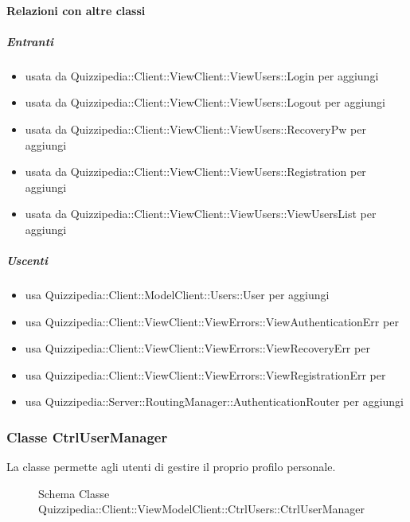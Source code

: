 \paragraph{Relazioni con altre classi}
\subparagraph{Entranti}
\begin{itemize}
\item usata da Quizzipedia::Client::ViewClient::ViewUsers::Login per aggiungi
\item usata da Quizzipedia::Client::ViewClient::ViewUsers::Logout per aggiungi
\item usata da Quizzipedia::Client::ViewClient::ViewUsers::RecoveryPw per aggiungi
\item usata da Quizzipedia::Client::ViewClient::ViewUsers::Registration per aggiungi
\item usata da Quizzipedia::Client::ViewClient::ViewUsers::ViewUsersList per aggiungi
\end{itemize}
\subparagraph{Uscenti}
\begin{itemize}
\item usa Quizzipedia::Client::ModelClient::Users::User per aggiungi
\item usa Quizzipedia::Client::ViewClient::ViewErrors::ViewAuthenticationErr per 
\item usa Quizzipedia::Client::ViewClient::ViewErrors::ViewRecoveryErr per 
\item usa Quizzipedia::Client::ViewClient::ViewErrors::ViewRegistrationErr per 
\item usa Quizzipedia::Server::RoutingManager::AuthenticationRouter per aggiungi
\end{itemize}
\subsubsection{Classe CtrlUserManager}
La classe permette agli utenti di gestire il proprio profilo personale.
\begin{figure}[H]
\centering
\noindent{}
\caption[Schema Classe CtrlUserManager]{Schema Classe Quizzipedia::Client::ViewModelClient::CtrlUsers::CtrlUserManager}
\end{figure}
